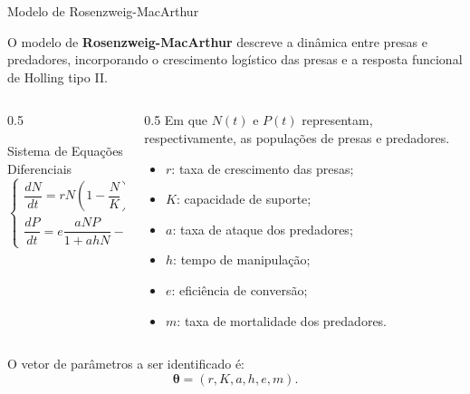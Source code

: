 \begin{frame}{Modelo de Rosenzweig-MacArthur}

O modelo de \textbf{Rosenzweig-MacArthur} descreve
a dinâmica entre presas e predadores, incorporando o
crescimento logístico das presas e a resposta funcional
de Holling tipo II.

\vspace{0.25cm}

\begin{columns}
    \begin{column}{0.5\textwidth}
        \begin{block}{Sistema de Equações Diferenciais}
        \begin{equation}
        \begin{cases}
        \dfrac{dN}{dt} = rN\left(1-\dfrac{N}{K}\right)
        - \dfrac{aNP}{1+ahN}, \\[8pt]
        \dfrac{dP}{dt} = e\dfrac{aNP}{1+ahN} - mP.
        \end{cases}
        \end{equation}
        \end{block}
    \end{column}
    \begin{column}{0.5\textwidth}
        Em que $N(t)$ e $P(t)$ representam, respectivamente,
        as populações de presas e predadores.

        \vspace{0.2cm}

        \begin{itemize}
            \item $r$: taxa de crescimento das presas;
            \item $K$: capacidade de suporte;
            \item $a$: taxa de ataque dos predadores;
            \item $h$: tempo de manipulação;
            \item $e$: eficiência de conversão;
            \item $m$: taxa de mortalidade dos predadores.
        \end{itemize}
    \end{column}
\end{columns}

\vspace{0.15cm}

O vetor de parâmetros a ser identificado é:
\[
\boldsymbol{\theta} =
(r,K,a,h,e,m).
\]

\end{frame}

